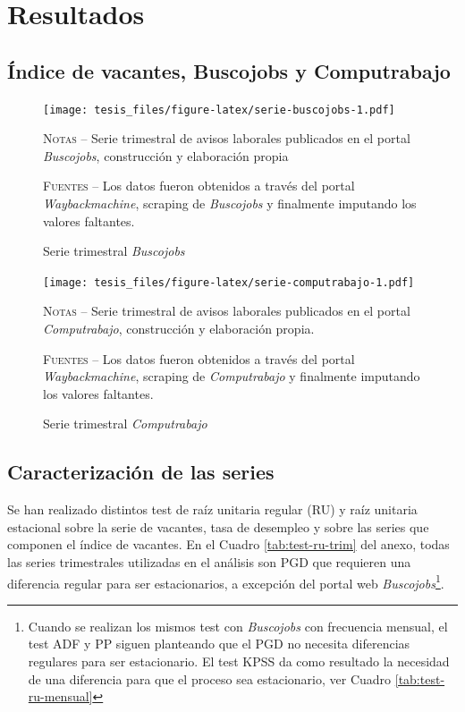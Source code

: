 \documentclass[12pt,oneside]{reedthesis}
\begin{document}
\hypertarget{resultados}{%
\section{Resultados}\label{resultados}}

\hypertarget{uxedndice-de-vacantes-buscojobs-y-computrabajo}{%
\subsection{Índice de vacantes, Buscojobs y Computrabajo}\label{uxedndice-de-vacantes-buscojobs-y-computrabajo}}
\begin{figure}
\texttt{[image: tesis\_files/figure-latex/serie-buscojobs-1.pdf]}
\caption{Serie trimestral \textit{Buscojobs}}\label{fig:serie-buscojobs}\textsc{}

\footnotesize\textsc{Notas} -- Serie trimestral de avisos laborales publicados en el portal \textit{Buscojobs}, construcción y elaboración propia

\textsc{Fuentes} -- Los datos fueron obtenidos a través del portal \textit{Waybackmachine}, scraping de \textit{Buscojobs} y finalmente imputando los valores faltantes.
\end{figure}
\begin{figure}
\texttt{[image: tesis\_files/figure-latex/serie-computrabajo-1.pdf]}
\caption{Serie trimestral \textit{Computrabajo}}\label{fig:serie-computrabajo}\textsc{}

\footnotesize\textsc{Notas} -- Serie trimestral de avisos laborales publicados en el portal \textit{Computrabajo}, construcción y elaboración propia.

\textsc{Fuentes} -- Los datos fueron obtenidos a través del portal \textit{Waybackmachine}, scraping de \textit{Computrabajo} y finalmente imputando los valores faltantes.
\end{figure}
\hypertarget{caracterizaciuxf3n-de-las-series}{%
\subsection{Caracterización de las series}\label{caracterizaciuxf3n-de-las-series}}

Se han realizado distintos test de raíz unitaria regular (RU) y raíz unitaria estacional sobre la serie de vacantes, tasa de desempleo y sobre las series que componen el índice de vacantes. En el Cuadro \ref{tab:test-ru-trim} del anexo, todas las series trimestrales utilizadas en el análisis son PGD que requieren una diferencia regular para ser estacionarios, a excepción del portal web \emph{Buscojobs}\footnote{Cuando se realizan los mismos test con \emph{Buscojobs} con frecuencia mensual, el test ADF y PP siguen planteando que el PGD no necesita diferencias regulares para ser estacionario. El test KPSS da como resultado la necesidad de una diferencia para que el proceso sea estacionario, ver Cuadro \ref{tab:test-ru-mensual}}.
\end{document}
